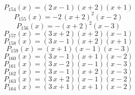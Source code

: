 \subitem \begin{dmath*}P_{154}(x) = {\left(2 \, x - 1\right)} {\left(x + 2\right)} {\left(x + 1\right)} \end{dmath*}\vspace{-1.2cm}
\subitem \begin{dmath*}P_{155}(x) = -2 \, {\left(x + 2\right)}^{2} {\left(x - 2\right)} \end{dmath*}\vspace{-1.2cm}
\subitem \begin{dmath*}P_{156}(x) = -{\left(x + 2\right)}^{2} {\left(x - 3\right)} \end{dmath*}\vspace{-1.2cm}
\subitem \begin{dmath*}P_{157}(x) = {\left(3 \, x + 2\right)} {\left(x + 2\right)} {\left(x - 1\right)} \end{dmath*}\vspace{-1.2cm}
\subitem \begin{dmath*}P_{158}(x) = {\left(3 \, x - 1\right)} {\left(x + 2\right)} {\left(x + 1\right)} \end{dmath*}\vspace{-1.2cm}
\subitem \begin{dmath*}P_{159}(x) = {\left(x + 1\right)} {\left(x - 1\right)} {\left(x - 3\right)} \end{dmath*}\vspace{-1.2cm}
\subitem \begin{dmath*}P_{160}(x) = {\left(3 \, x - 1\right)} {\left(x + 1\right)} {\left(x - 2\right)} \end{dmath*}\vspace{-1.2cm}
\subitem \begin{dmath*}P_{161}(x) = {\left(3 \, x - 2\right)} {\left(x - 1\right)} {\left(x - 3\right)} \end{dmath*}\vspace{-1.2cm}
\subitem \begin{dmath*}P_{162}(x) = {\left(3 \, x - 1\right)} {\left(x + 2\right)} {\left(x - 3\right)} \end{dmath*}\vspace{-1.2cm}
\subitem \begin{dmath*}P_{163}(x) = {\left(3 \, x + 2\right)} {\left(x - 1\right)} {\left(x - 2\right)} \end{dmath*}\vspace{-1.2cm}
\subitem \begin{dmath*}P_{164}(x) = {\left(3 \, x + 1\right)} {\left(x + 1\right)} {\left(x - 2\right)} \end{dmath*}\vspace{-1.2cm}
